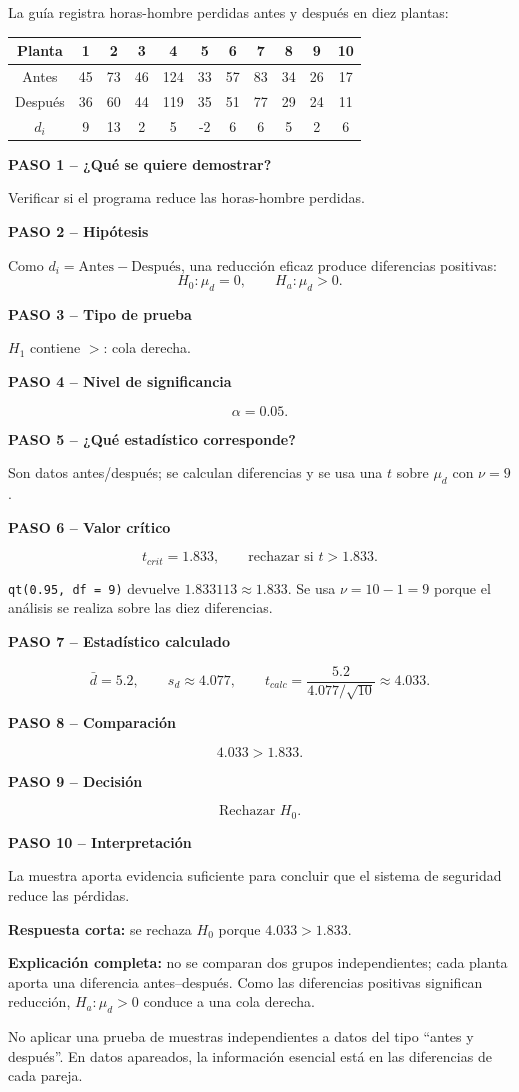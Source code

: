 \documentclass[11pt,a4paper]{article}
\newcommand{\paso}[2]{\par\medskip\noindent\textbf{PASO #1 -- #2}\par}
\begin{document}
La guía registra horas-hombre perdidas antes y después en diez plantas:

\begin{table}[H]
\centering
\small
\begin{tabular}{c*{10}{c}}
\toprule
Planta &1&2&3&4&5&6&7&8&9&10\\
\midrule
Antes &45&73&46&124&33&57&83&34&26&17\\
Después&36&60&44&119&35&51&77&29&24&11\\
$d_i$ &9&13&2&5&-2&6&6&5&2&6\\
\bottomrule
\end{tabular}
\end{table}

\paso{1}{¿Qué se quiere demostrar?} Verificar si el programa reduce las horas-hombre perdidas.
\paso{2}{Hipótesis} Como $d_i=\text{Antes}-\text{Después}$, una reducción eficaz produce diferencias positivas:
\[
H_0:\mu_d=0,
\qquad
H_a:\mu_d>0.
\]
\paso{3}{Tipo de prueba} $H_1$ contiene $>$: cola derecha.
\paso{4}{Nivel de significancia} \[\alpha=0.05.\]
\paso{5}{¿Qué estadístico corresponde?} Son datos antes/después; se calculan diferencias y se usa una $t$ sobre $\mu_d$ con $\nu=9$.
\paso{6}{Valor crítico} \[t_{crit}=1.833,\qquad \text{rechazar si }t>1.833.\]
\begin{calculor}
\texttt{qt(0.95, df = 9)} devuelve $1.833113\approx1.833$. Se usa $\nu=10-1=9$ porque el análisis se realiza sobre las diez diferencias.
\end{calculor}
\paso{7}{Estadístico calculado}
\[
\bar d=5.2,
\qquad s_d\approx4.077,
\qquad
 t_{calc}=\frac{5.2}{4.077/\sqrt{10}}\approx4.033.
\]
\paso{8}{Comparación} \[4.033>1.833.\]
\paso{9}{Decisión} \[\boxed{\text{Rechazar }H_0}.\]
\paso{10}{Interpretación} La muestra aporta evidencia suficiente para concluir que el sistema de seguridad reduce las pérdidas.

\begin{preguntaoral}
\textbf{Respuesta corta:} se rechaza $H_0$ porque $4.033>1.833$.\par
\textbf{Explicación completa:} no se comparan dos grupos independientes; cada planta aporta una diferencia antes--después. Como las diferencias positivas significan reducción, $H_a:\mu_d>0$ conduce a una cola derecha.
\end{preguntaoral}

\begin{errorfrecuente}
No aplicar una prueba de muestras independientes a datos del tipo ``antes y después''. En datos apareados, la información esencial está en las diferencias de cada pareja.
\end{errorfrecuente}
\end{document}
